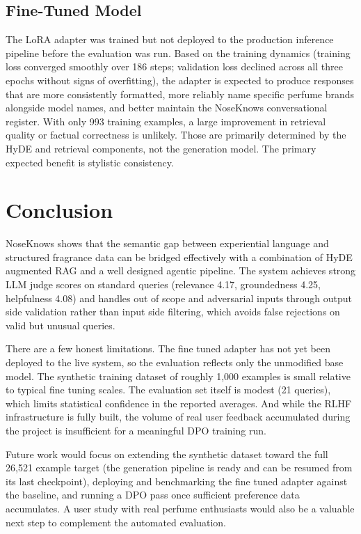\documentclass[11pt,a4paper]{article}
\begin{document}
\subsection{Fine-Tuned Model}

The LoRA adapter was trained but not deployed to the production inference pipeline before the evaluation was run. Based on the training dynamics (training loss converged smoothly over 186 steps; validation loss declined across all three epochs without signs of overfitting), the adapter is expected to produce responses that are more consistently formatted, more reliably name specific perfume brands alongside model names, and better maintain the NoseKnows conversational register. With only 993 training examples, a large improvement in retrieval quality or factual correctness is unlikely. Those are primarily determined by the HyDE and retrieval components, not the generation model. The primary expected benefit is stylistic consistency.

\FloatBarrier

\section{Conclusion}
\label{sec:conclusion}

NoseKnows shows that the semantic gap between experiential language and structured fragrance data can be bridged effectively with a combination of HyDE augmented RAG and a well designed agentic pipeline. The system achieves strong LLM judge scores on standard queries (relevance 4.17, groundedness 4.25, helpfulness 4.08) and handles out of scope and adversarial inputs through output side validation rather than input side filtering, which avoids false rejections on valid but unusual queries.

There are a few honest limitations. The fine tuned adapter has not yet been deployed to the live system, so the evaluation reflects only the unmodified base model. The synthetic training dataset of roughly 1,000 examples is small relative to typical fine tuning scales. The evaluation set itself is modest (21 queries), which limits statistical confidence in the reported averages. And while the RLHF infrastructure is fully built, the volume of real user feedback accumulated during the project is insufficient for a meaningful DPO training run.

Future work would focus on extending the synthetic dataset toward the full 26,521 example target (the generation pipeline is ready and can be resumed from its last checkpoint), deploying and benchmarking the fine tuned adapter against the baseline, and running a DPO pass once sufficient preference data accumulates. A user study with real perfume enthusiasts would also be a valuable next step to complement the automated evaluation.



\end{document}
